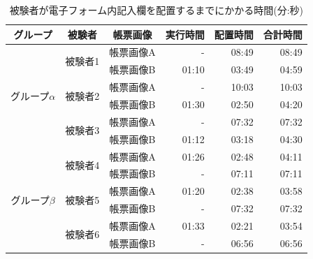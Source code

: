 \begin{table}[tp]
    \caption{被験者が電子フォーム内記入欄を配置するまでにかかる時間(分:秒)}
	\label{tb:result_time}
    \centering
    \begin{tabular}{ccc||rrr} 
    グループ & 被験者 & 帳票画像 & 実行時間 & 配置時間 & 合計時間 \\
    \hline \hline
    
    \multirow{6}{*}{グループ$\alpha$} & \multirow{2}{*}{被験者1} & 帳票画像A & - & 08:49 & 08:49 \\ %
                                                            & & 帳票画像B & 01:10 & 03:49 & 04:59 \\ 

                                    & \multirow{2}{*}{被験者2} & 帳票画像A & - & 10:03 & 10:03 \\ %
                                                            & & 帳票画像B & 01:30 & 02:50 & 04:20 \\
                                                            
                                    & \multirow{2}{*}{被験者3} & 帳票画像A & - & 07:32 & 07:32 \\ %
                                                            & & 帳票画像B & 01:12 & 03:18 & 04:30 \\
                                                            

                                                            \hline
    \multirow{6}{*}{グループ$\beta$} & \multirow{2}{*}{被験者4} & 帳票画像A & 01:26 & 02:48 & 04:11 \\ %
                                                            & & 帳票画像B & - & 07:11 & 07:11 \\
                                                            
                                    & \multirow{2}{*}{被験者5} & 帳票画像A & 01:20 & 02:38 & 03:58 \\ %
                                                            & & 帳票画像B & - & 07:32 & 07:32 \\ 
                                                            
                                    & \multirow{2}{*}{被験者6} & 帳票画像A & 01:33 & 02:21 & 03:54 \\
                                                            & & 帳票画像B & - & 06:56 & 06:56 \\ 

    \end{tabular}
\end{table}

